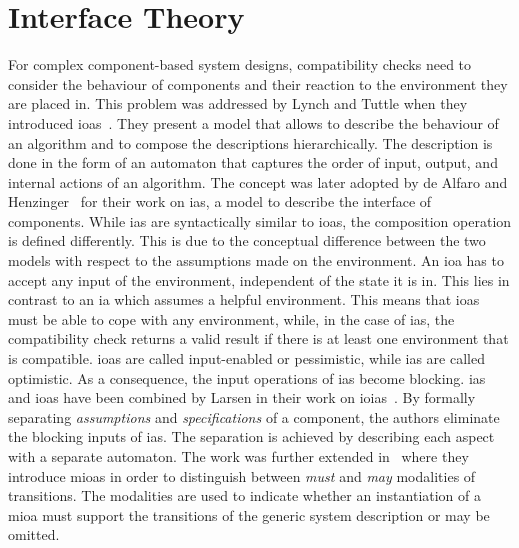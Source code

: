 \section{Interface Theory}
\label{sect_related_interface}
For complex component-based system designs, compatibility checks need to consider the behaviour of components and their reaction to the environment they are placed in.
This problem was addressed by Lynch and Tuttle when they introduced \glspl{ioa}~\cite{lynch1987}.
They present a model that allows to describe the behaviour of an algorithm and to compose the descriptions hierarchically.
The description is done in the form of an automaton that captures the order of input, output, and internal actions of an algorithm.
The concept was later adopted by de Alfaro and Henzinger~\cite{deAlfaro2001a} for their work on \glspl{ia}, a model to describe the interface of components.
While \glspl{ia} are syntactically similar to \glspl{ioa}, the composition operation is defined differently.
This is due to the conceptual difference between the two models with respect to the assumptions made on the environment.
An \gls{ioa} has to accept any input of the environment, independent of the state it is in.
This lies in contrast to an \gls{ia} which assumes a helpful environment.
This means that \glspl{ioa} must be able to cope with any environment, while, in the case of \glspl{ia}, the compatibility check returns a valid result if there is at least one environment that is compatible.
\Glspl{ioa} are called input-enabled or pessimistic, while \glspl{ia} are called optimistic.
As a consequence, the input operations of \glspl{ia} become blocking.
\glspl{ia} and \glspl{ioa} have been combined by Larsen \etal in their work on \glspl{ioia}~\cite{larsen2006}.
By formally separating \emph{assumptions} and \emph{specifications} of a component, the authors eliminate the blocking inputs of \glspl{ia}.
The separation is achieved by describing each aspect with a separate automaton.
The work was further extended in~\cite{larsen2007} where they introduce \glspl{mioa} in order to distinguish between \emph{must} and \emph{may} modalities of transitions.
The modalities are used to indicate whether an instantiation of a \gls{mioa} must support the transitions of the generic system description or may be omitted.

